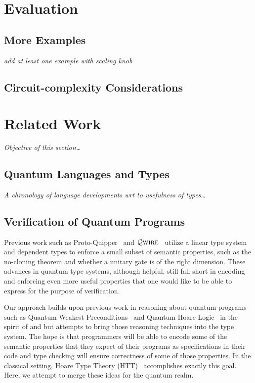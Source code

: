 \documentclass[acmsmall,nonacm,timestamp]{acmart}
\newcommand{\qwire}{\ensuremath{\mathcal{Q}\textsc{wire}}\xspace}
\begin{document}
\section{Evaluation}

\subsection{More Examples}
\textit{add at least one example with scaling knob}

\subsection{Circuit-complexity Considerations}

\section{Related Work}
\textit{Objective of this section\ldots}

\subsection{Quantum Languages and Types}
\textit{A chronology of language developments wrt to usefulness of types\ldots}

\subsection{Verification of Quantum Programs}
Previous work such as Proto-Quipper~\cite{ross_algebraic_2015,mahmoud_formalization_2019,rios_categorical_2017} and \qwire~\cite{paykin_qwire:_2017,rand_qwire_2017,rand_formally_2018} utilize a linear type system and dependent types to enforce a small subset of semantic properties, such as the no-cloning theorem and whether a unitary gate is of the right dimension. These advances in quantum type systems, although helpful, still fall short in encoding and enforcing even more useful properties that one would like to be able to express for the purpose of verification.

Our approach builds upon previous work in reasoning about quantum programs such as Quantum Weakest Preconditions~\cite{dhondt_quantum_2006} and Quantum Hoare Logic~\cite{ying_floydhoare_2012} in the spirit of \citet{hoare_axiomatic_1969} and \citet{dijkstra_discipline_1976} but attempts to bring those reasoning techniques into the type system. The hope is that programmers will be able to encode some of the semantic properties that they expect of their programs as specifications in their code and type checking will ensure correctness of some of those properties. In the classical setting, Hoare Type Theory (HTT)~\cite{nanevski_hoare_2008} accomplishes exactly this goal. Here, we attempt to merge these ideas for the quantum realm.
\end{document}
